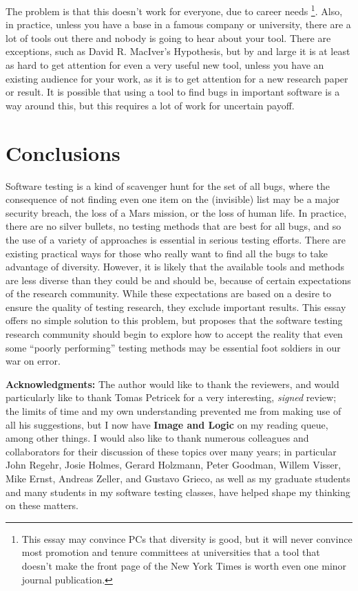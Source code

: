 \documentclass[sigplan,screen]{acmart}
\begin{document}
The problem is that this doesn't work for everyone, due to career
needs \footnote{This essay may convince PCs that diversity is good,
  but it will never convince most promotion and tenure committees at
  universities that a tool that doesn't make the front page of the New
  York Times is worth even one minor journal publication.}.  Also, in practice,
unless you have a base in a famous company or university, there are a
lot of tools out there and nobody is going to hear about your tool.
There are exceptions, such as David R. MacIver's Hypothesis, but by
and large it is at least as hard to get attention for even a very
useful new tool, unless you have an existing audience for your work,
as it is to get attention for a new research paper or result.  It is
possible that using a tool to find bugs in important software is a way
around this, but this requires a lot of work for uncertain payoff.

\section{Conclusions}

Software testing is a kind of scavenger hunt for the set of all bugs,
where the consequence of not finding even one item on the (invisible)
list may be a major security breach, the loss of a Mars mission, or
the loss of human life.  In practice, there are no silver bullets, no
testing methods that are best for all bugs, and so the use of a
variety of approaches is essential in serious testing efforts.  There
are existing practical ways for those who really want to find all the
bugs to take advantage of diversity.  However, it is likely that the
available tools and methods are less diverse than they could be and
should be, because of certain expectations of the research community.
While these expectations are based on a desire to ensure the quality
of testing research, they exclude important results.   This essay
offers no simple solution to this problem, but proposes that the
software testing research community should begin to explore how to
accept the reality that even some ``poorly performing'' testing methods may
be essential foot soldiers in our war on error.

{\bf Acknowledgments:} The author would like to thank the 
reviewers, and would particularly like to thank Tomas Petricek for a
very interesting, \emph{signed} review; the limits of time and my own
understanding prevented me from making use of all his suggestions, but
I now have {\bf Image and Logic} on my reading queue, among other
things.  I would also like to thank numerous colleagues and
collaborators for their discussion of these topics over many years; in
particular John Regehr, Josie Holmes, Gerard Holzmann, Peter Goodman,
Willem Visser, Mike Ernst, Andreas Zeller, and
Gustavo Grieco, as well as my graduate students and many students in my
software testing classes, have helped shape my thinking on these matters.

\balance




\balance
\end{document}
